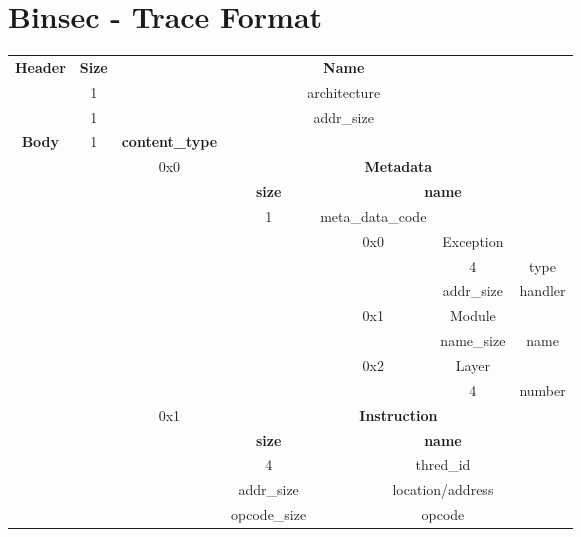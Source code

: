 \documentclass{report}
\begin{document}
 \chapter{Binsec -  Trace Format}


\footnotesize
\begin{tabular}{| * {7} {c|} }
\hline
\multirow{3}{*}{\bf Header}  & \bf Size & \multicolumn{5}{|c|}{\bf Name} \\ \cline{2-7}
						 & 1    & \multicolumn{5}{|c|}{architecture} \\ \cline{2-7}
						 & 1    & \multicolumn{5}{|c|}{addr\_size} \\ \hline
\multirow{15}{*}{\bf Body}  & 1 & \bf content\_type & \multicolumn{4}{|c|}{} \\ \cline{2-7}
					    & \multicolumn{1}{c|}{}  & 0x0 & \multicolumn{4}{|c|}{\bf Metadata} \\ \cline{3-7}
						& \multicolumn{2}{|c|}{} & \bf size & \multicolumn{3}{|c|}{\bf name} \\ \cline{4-7} 
						& \multicolumn{2}{|c|}{} & 1 & meta\_data\_code &  \multicolumn{2}{|c|}{} \\ \cline{4-7}
						& \multicolumn{3}{|c|}{}  & 0x0 & Exception &  \multicolumn{1}{|c|}{} \\ \cline{5-7}
						& \multicolumn{4}{|c|}{} & 4 & type  \\ \cline{6-7}
						& \multicolumn{4}{|c|}{} & addr\_size & handler  \\ \cline{5-7}
						& \multicolumn{3}{|c|}{} & 0x1& Module & \multicolumn{1}{|c|}{}  \\ \cline{5-7}
						& \multicolumn{4}{|c|}{} & name\_size & name  \\ \cline{5-7}
						& \multicolumn{3}{|c|}{} & 0x2 & Layer  & \multicolumn{1}{|c|}{}  \\ \cline{5-7}
						& \multicolumn{4}{|c|}{} & 4 & number \\ \cline{3-7}
						& \multicolumn{1}{|c|}{} & 0x1 & \multicolumn{4}{|c|}{\bf Instruction} \\ \cline{3-7}
						& \multicolumn{2}{|c|}{} & \bf size & \multicolumn{3}{|c|}{\bf name} \\ \cline{4-7} 
						& \multicolumn{2}{|c|}{} & 4 & \multicolumn{3}{|c|}{thred\_id} \\ \cline{4-7}
						& \multicolumn{2}{|c|}{} & addr\_size& \multicolumn{3}{|c|}{location/address} \\ \cline{4-7}
						& \multicolumn{2}{|c|}{} & opcode\_size & \multicolumn{3}{|c|}{opcode} \\ \cline{4-7} 

\end{tabular}
\end{document}
